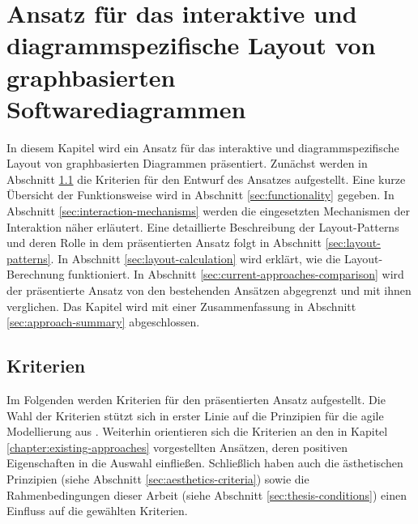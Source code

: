 
\chapter{Ansatz für das interaktive und diagrammspezifische Layout von graphbasierten Softwarediagrammen}
\label{chapter:interactive-approach}

In diesem Kapitel wird ein Ansatz für das interaktive und diagrammspezifische Layout von graphbasierten Diagrammen präsentiert. Zunächst werden in Abschnitt \ref{sec:criteria} die Kriterien für den Entwurf des Ansatzes aufgestellt. Eine kurze Übersicht der Funktionsweise wird in Abschnitt \ref{sec:functionality} gegeben. In Abschnitt \ref{sec:interaction-mechanisms} werden die eingesetzten Mechanismen der Interaktion näher erläutert. Eine detaillierte Beschreibung der Layout-Patterns und deren Rolle in dem präsentierten Ansatz folgt in Abschnitt \ref{sec:layout-patterns}. In Abschnitt \ref{sec:layout-calculation} wird erklärt, wie die Layout-Berechnung funktioniert. In Abschnitt \ref{sec:current-approaches-comparison} wird der präsentierte Ansatz von den bestehenden Ansätzen abgegrenzt und mit ihnen verglichen. Das Kapitel wird mit einer Zusammenfassung in Abschnitt \ref{sec:approach-summary} abgeschlossen.


\section{Kriterien}
\label{sec:criteria}

Im Folgenden werden Kriterien für den präsentierten Ansatz aufgestellt. Die Wahl der Kriterien stützt sich in erster Linie auf die Prinzipien für die agile Modellierung aus \cite{Ambler02Agile}. Weiterhin orientieren sich die Kriterien an den in Kapitel \ref{chapter:existing-approaches} vorgestellten Ansätzen, deren positiven Eigenschaften in die Auswahl einfließen.   Schließlich haben auch die ästhetischen Prinzipien (siehe Abschnitt \ref{sec:aesthetics-criteria}) sowie die Rahmenbedingungen dieser Arbeit (siehe Abschnitt \ref{sec:thesis-conditions}) einen Einfluss auf die gewählten Kriterien.

